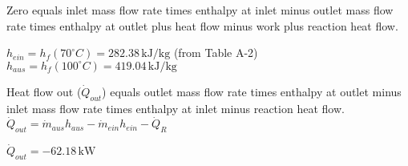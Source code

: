 Zero equals inlet mass flow rate times enthalpy at inlet minus outlet mass flow rate times enthalpy at outlet plus heat flow minus work plus reaction heat flow.  

\( h_{ein} = h_f(70^\circ C) = 282.38 \, \text{kJ/kg} \) (from Table A-2)  
\( h_{aus} = h_f(100^\circ C) = 419.04 \, \text{kJ/kg} \)  

Heat flow out (\( \dot{Q}_{out} \)) equals outlet mass flow rate times enthalpy at outlet minus inlet mass flow rate times enthalpy at inlet minus reaction heat flow.  
\( \dot{Q}_{out} = \dot{m}_{aus} h_{aus} - \dot{m}_{ein} h_{ein} - \dot{Q}_R \)  

\( \dot{Q}_{out} = -62.18 \, \text{kW} \)